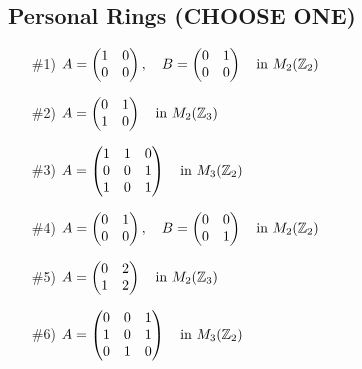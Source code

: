 \subsection{Personal Rings (CHOOSE ONE)}
\begin{enumerate}
    \setlength{\itemsep}{5pt} %
    \item[\#1)] \( A = \begin{pmatrix} 1 & 0 \\ 0 & 0 \end{pmatrix}, \quad 
                  B = \begin{pmatrix} 0 & 1 \\ 0 & 0 \end{pmatrix} 
                  \quad \text{in } M_2({\mathbb{ Z}}_2) \)
    
    \item[\#2)] \( A = \begin{pmatrix} 0 & 1 \\ 1 & 0 \end{pmatrix} 
                  \quad \text{in } M_2({\mathbb{ Z}}_3) \)
    
    \item[\#3)] \( A = \begin{pmatrix} 1 & 1 & 0 \\ 0 & 0 & 1 \\ 1 & 0 & 1 \end{pmatrix} 
                  \quad \text{in } M_3({\mathbb{ Z}}_2) \)
    
    \item[\#4)] \( A = \begin{pmatrix} 0 & 1 \\ 0 & 0 \end{pmatrix}, \quad 
                  B = \begin{pmatrix} 0 & 0 \\ 0 & 1 \end{pmatrix} 
                  \quad \text{in } M_2({\mathbb{ Z}}_2) \)
    
    \item[\#5)] \( A = \begin{pmatrix} 0 & 2 \\ 1 & 2 \end{pmatrix} 
                  \quad \text{in } M_2({\mathbb{ Z}}_3) \)
    
    \item[\#6)] \( A = \begin{pmatrix} 0 & 0 & 1 \\ 1 & 0 & 1 \\ 0 & 1 & 0 \end{pmatrix} 
                  \quad \text{in } M_3({\mathbb{ Z}}_2) \)
    

\end{enumerate}
